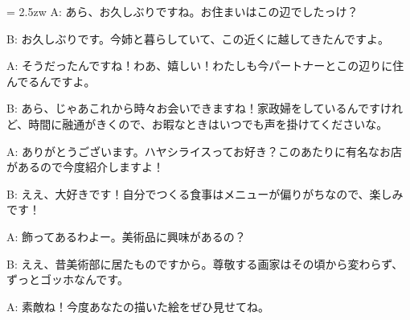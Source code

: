 \documentclass[11pt]{amsart}
\title{}
\author{}
\newenvironment{hangall}[1]{\hangindent = 2.5zw\everypar{\hangindent = 2.5zw}}{}
\begin{document}
\maketitle
\begin{hangall}{}%
A: あら、お久しぶりですね。お住まいはこの辺でしたっけ？



B: お久しぶりです。今姉と暮らしていて、この近くに越してきたんですよ。



A: そうだったんですね！わあ、嬉しい！わたしも今パートナーとこの辺りに住んでるんですよ。



B: あら、じゃあこれから時々お会いできますね！家政婦をしているんですけれど、時間に融通がきくので、お暇なときはいつでも声を掛けてくださいな。



A: ありがとうございます。ハヤシライスってお好き？このあたりに有名なお店があるので今度紹介しますよ！



B: ええ、大好きです！自分でつくる食事はメニューが偏りがちなので、楽しみです！



A: 飾ってあるわよー。美術品に興味があるの？



B: ええ、昔美術部に居たものですから。尊敬する画家はその頃から変わらず、ずっとゴッホなんです。



A: 素敵ね！今度あなたの描いた絵をぜひ見せてね。\end{hangall}
\end{document}
